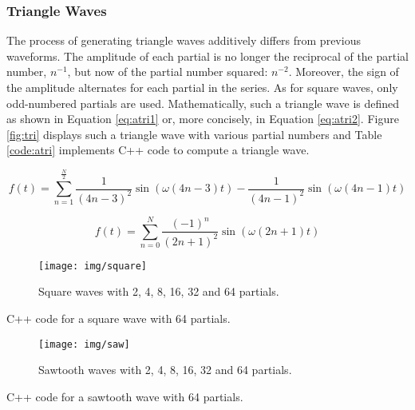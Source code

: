 \subsubsection{Triangle Waves}

The process of generating triangle waves additively differs from previous waveforms. The amplitude of each partial is no longer the reciprocal of the partial number, $n^{-1}$, but now of the partial number squared: $n^{-2}$. Moreover, the sign of the amplitude alternates for each partial in the series. As for square waves, only odd-numbered partials are used. Mathematically, such a triangle wave is defined as shown in Equation \ref{eq:atri1} or, more concisely, in Equation \ref{eq:atri2}. Figure \ref{fig:tri} displays such a triangle wave with various partial numbers and Table \ref{code:atri} implements C++ code to compute a triangle wave.

\begin{equation}
  f(t) = \sum\limits_{n=1}^\frac{N}{2} \frac{1}{(4n-3)^2}\sin(\omega (4n-3) t) - \frac{1}{(4n-1)^2}\sin(\omega (4n-1) t)
  \label{eq:atri1}
\end{equation}

\begin{equation}
  f(t) = \sum\limits_{n=0}^N \frac{(-1)^n}{(2n+1)^2} \sin(\omega (2n + 1) t)
  \label{eq:atri2}
\end{equation}

\pagebreak

\begin{figure}[h!]
  \texttt{[image: img/square]}
  \caption{Square waves with 2, 4, 8, 16, 32 and 64 partials.}
  \label{fig:square}
\end{figure}

\begin{table}[h!]
  \caption{C++ code for a square wave with 64 partials.}
  \label{code:asquare}
\end{table}

\pagebreak

\begin{figure}[h!]
  \texttt{[image: img/saw]}
  \caption{Sawtooth waves with 2, 4, 8, 16, 32 and 64 partials.}
  \label{fig:saw}
\end{figure}

\begin{table}[h!]
  \caption{C++ code for a sawtooth wave with 64 partials.}
  \label{code:asaw}
\end{table}

